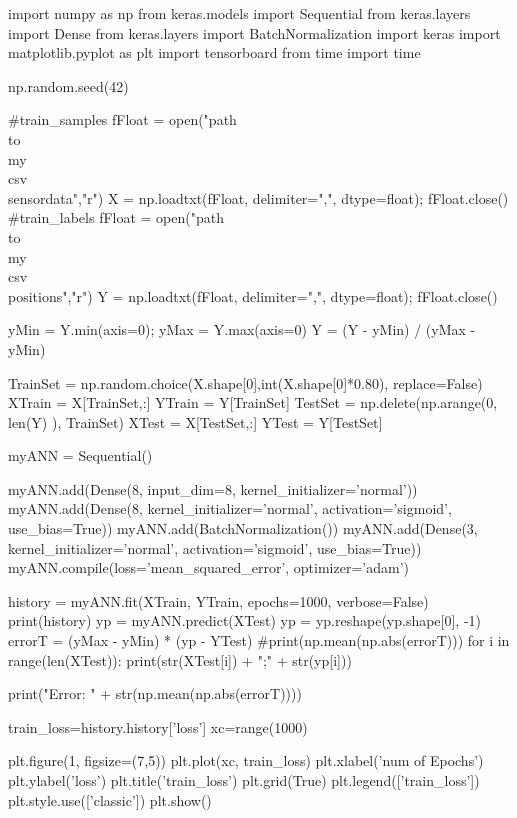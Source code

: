 \begin{python}
import numpy as np
from keras.models import Sequential
from keras.layers import Dense
from keras.layers import BatchNormalization
import keras
import matplotlib.pyplot as plt
import tensorboard
from time import time

np.random.seed(42)

#train_samples
fFloat = open("path\\to\\my\\
               csv\\sensordata","r")
X = np.loadtxt(fFloat, delimiter=",", 
               dtype=float); fFloat.close()
#train_labels
fFloat = open("path\\to\\my\\
               csv\\positions","r")
Y = np.loadtxt(fFloat, delimiter=",",
               dtype=float); fFloat.close()

yMin = Y.min(axis=0); yMax = Y.max(axis=0)
Y = (Y - yMin) / (yMax - yMin)

TrainSet = np.random.choice(X.shape[0],int(X.shape[0]*0.80), 
                            replace=False)
XTrain = X[TrainSet,:]
YTrain = Y[TrainSet]
TestSet = np.delete(np.arange(0, len(Y) ), TrainSet)
XTest = X[TestSet,:]
YTest = Y[TestSet]

myANN = Sequential()

myANN.add(Dense(8, input_dim=8, 
                kernel_initializer='normal'))
myANN.add(Dense(8, kernel_initializer='normal', 
                activation='sigmoid', use_bias=True))
myANN.add(BatchNormalization())
myANN.add(Dense(3, kernel_initializer='normal', 
                activation='sigmoid', use_bias=True))
myANN.compile(loss='mean_squared_error', optimizer='adam')


history = myANN.fit(XTrain, YTrain, 
                    epochs=1000, verbose=False)
print(history)
yp = myANN.predict(XTest)
yp = yp.reshape(yp.shape[0], -1)
errorT = (yMax - yMin) * (yp - YTest)
#print(np.mean(np.abs(errorT)))
for i in range(len(XTest)):
    print(str(XTest[i]) + ";" + str(yp[i]))

print("Error: " + str(np.mean(np.abs(errorT))))

train_loss=history.history['loss']
xc=range(1000)

plt.figure(1, figsize=(7,5))
plt.plot(xc, train_loss)
plt.xlabel('num of Epochs')
plt.ylabel('loss')
plt.title('train_loss')
plt.grid(True)
plt.legend(['train_loss'])
plt.style.use(['classic'])
plt.show()
\end{python}

\newpage